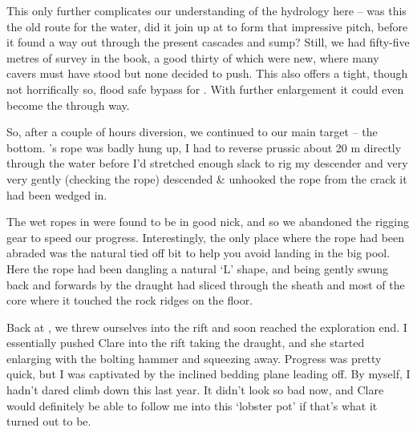 
This only further complicates
our understanding of the hydrology here -- was this the old route for
the  water, did it join up at  to form that
impressive pitch, before it found a way out through the present cascades
and sump? Still, we had fifty-five metres of survey in the book, a good
thirty of which were new, where many cavers must have stood but none
decided to push. This also offers a tight, though not horrifically so,
flood safe bypass for . With further enlargement it could even
become the through way.

So, after a couple of hours diversion, we continued to our main target
-- the bottom. 's rope was badly hung up, I had to
reverse prussic about 20 m directly through the water before I'd
stretched enough slack to rig my descender and very very gently
(checking the rope) descended \& unhooked the rope from the crack it had
been wedged in.

The wet ropes in  were found to be in good nick, and so
we abandoned the rigging gear to speed our progress. Interestingly, the
only place where the rope had been abraded was the natural tied off bit
to help you avoid landing in the big pool. Here the rope had been
dangling a natural `L' shape, and being gently swung back and forwards
by the draught had sliced through the sheath and most of the core where
it touched the rock ridges on the floor.


Back at , we threw ourselves into the rift and soon
reached the exploration end. I essentially pushed Clare into the rift
taking the draught, and she started enlarging with the bolting hammer
and squeezing away. Progress was pretty quick, but I was captivated by
the inclined bedding plane leading off. By myself, I hadn't dared climb
down this last year. It didn't look so bad now, and Clare would
definitely be able to follow me into this `lobster pot' if that's what
it turned out to be.

